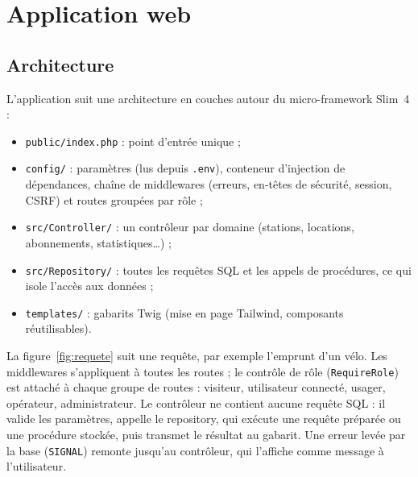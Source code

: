 \section{Application web}\label{sec:application}

\subsection{Architecture}

L'application suit une architecture en couches autour du micro-framework Slim~4 :
\begin{itemize}
	\item \texttt{public/index.php} : point d'entrée unique ;
	\item \texttt{config/} : paramètres (lus depuis \texttt{.env}), conteneur d'injection de dépendances, chaîne de middlewares (erreurs, en-têtes de sécurité, session, CSRF) et routes groupées par rôle ;
	\item \texttt{src/Controller/} : un contrôleur par domaine (stations, locations, abonnements, statistiques\ldots) ;
	\item \texttt{src/Repository/} : toutes les requêtes SQL et les appels de procédures, ce qui isole l'accès aux données ;
	\item \texttt{templates/} : gabarits Twig (mise en page Tailwind, composants réutilisables).
\end{itemize}

La figure~\ref{fig:requete} suit une requête, par exemple l'emprunt d'un vélo. Les middlewares s'appliquent à toutes les routes ; le contrôle de rôle (\texttt{RequireRole}) est attaché à chaque groupe de routes : visiteur, utilisateur connecté, usager, opérateur, administrateur. Le contrôleur ne contient aucune requête SQL : il valide les paramètres, appelle le repository, qui exécute une requête préparée ou une procédure stockée, puis transmet le résultat au gabarit. Une erreur levée par la base (\texttt{SIGNAL}) remonte jusqu'au contrôleur, qui l'affiche comme message à l'utilisateur.

